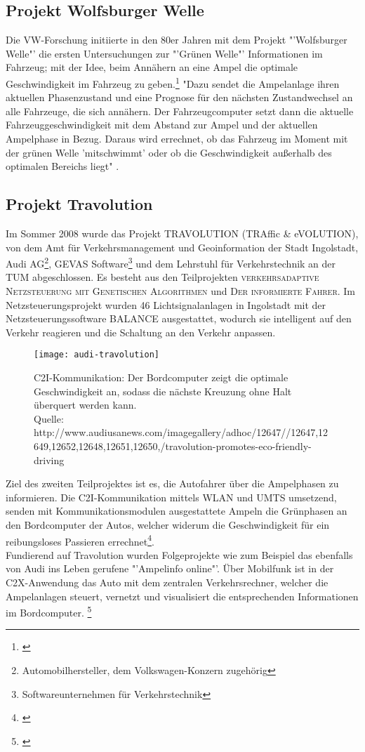 \subsection{Projekt Wolfsburger Welle}
Die \gls{VW}-Forschung initiierte in den 80er Jahren mit dem Projekt "'Wolfsburger Welle"' die ersten Untersuchungen zur "'Grünen Welle"' Informationen im Fahrzeug; mit der Idee, beim Annähern an eine Ampel die optimale Geschwindigkeit im Fahrzeug zu geben.\footnote{\cite{Welle}} "Dazu sendet die Ampelanlage ihren aktuellen Phasenzustand und eine Prognose für den nächsten Zustandwechsel an alle Fahrzeuge, die sich annähern. Der Fahrzeugcomputer setzt dann die aktuelle Fahrzeuggeschwindigkeit mit dem Abstand zur Ampel und der aktuellen Ampelphase in Bezug. Daraus wird errechnet, ob das Fahrzeug im Moment mit der grünen Welle ’mitschwimmt’ oder ob die Geschwindigkeit außerhalb des optimalen Bereichs liegt" \cite{MenschMaschine}.
\subsection{Projekt Travolution}
Im Sommer 2008 wurde das Projekt TRAVOLUTION (TRAffic \& eVOLUTION), von dem Amt für Verkehrsmanagement und Geoinformation der Stadt Ingolstadt, Audi AG\footnote{ Automobilhersteller, dem Volkswagen-Konzern zugehörig}, GEVAS Software\footnote{ Softwareunternehmen für Verkehrstechnik} und dem Lehrstuhl für Verkehrstechnik an der \gls{TUM} abgeschlossen. Es besteht aus den Teilprojekten \textsc{verkehrsadaptive Netzsteuerung mit Genetischen Algorithmen} und \textsc{Der informierte Fahrer}. Im Netzsteuerungsprojekt wurden 46 Lichtsignalanlagen in Ingolstadt mit der Netzsteuerungssoftware BALANCE ausgestattet, wodurch sie intelligent auf den Verkehr reagieren und die Schaltung an den Verkehr anpassen. 
\begin{figure}[H]  
    \centering  
    \texttt{[image: audi-travolution]}
    \label{fig:travolution}
    \caption[Projekt Travolution]{\gls{C2I}-Kommunikation: Der Bordcomputer zeigt die optimale Geschwindigkeit an, sodass die nächste Kreuzung ohne Halt überquert werden kann.\\ Quelle: {http://www.audiusanews.com/imagegallery/adhoc/12647//12647,12649,12652,12648,12651,12650,/travolution-promotes-eco-friendly-driving}}
\end{figure}
Ziel des zweiten Teilprojektes ist es, die Autofahrer über die Ampelphasen zu informieren. Die \gls{C2I}-Kommunikation mittels \gls{WLAN} und \gls{UMTS} umsetzend, senden mit Kommunikationsmodulen ausgestattete Ampeln die Grünphasen an den Bordcomputer der Autos, welcher widerum die Geschwindigkeit für ein reibungsloses Passieren errechnet\footnote{\cite{Travolution, AudiTravolution}}.\\ 
Fundierend auf Travolution wurden Folgeprojekte wie zum Beispiel das ebenfalls von Audi ins Leben gerufene "'Ampelinfo online"'. Über Mobilfunk ist in der \gls{C2X}-Anwendung das Auto mit dem zentralen Verkehrsrechner, welcher die Ampelanlagen steuert, vernetzt und visualisiert die entsprechenden Informationen im Bordcomputer. \footnote{\cite{Ampelinfo}}
